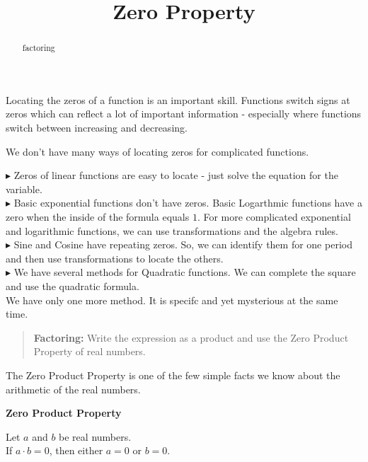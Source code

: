 \documentclass{ximera}
\title{Zero Property}
\begin{document}
\begin{abstract}
factoring
\end{abstract}
\maketitle




Locating the zeros of a function is an important skill.  Functions switch signs at zeros which can reflect a lot of important information  - especially where functions switch between increasing and decreasing.

We don't have many ways of locating zeros for complicated functions.


\textbf{\textcolor{blue!55!black}{$\blacktriangleright$}} Zeros of linear functions are easy to locate - just solve the equation for the variable. \\


\textbf{\textcolor{blue!55!black}{$\blacktriangleright$}} Basic exponential functions don't have zeros.  Basic Logarthmic functions have a zero when the inside of the formula equals $1$. For more complicated exponential and logarithmic functions, we can use transformations and the algebra rules. \\

\textbf{\textcolor{blue!55!black}{$\blacktriangleright$}} Sine and Cosine have repeating zeros. So, we can identify them for one period and then use transformations to locate the others. \\

\textbf{\textcolor{blue!55!black}{$\blacktriangleright$}} We have several methods for Quadratic functions.  We can complete the square and use the quadratic formula. \\



We have only one more method.  It is specifc and yet mysterious at the same time.



\begin{quote}
\textbf{Factoring: } Write the expression as a product and use the Zero Product Property of real numbers.
\end{quote}



The Zero Product Property is one of the few simple facts we know about the arithmetic of the real numbers.


\begin{definition} \textbf{\textcolor{green!50!black}{Zero Product Property}}  

Let $a$ and $b$ be real numbers. \\

If $a \cdot b = 0$, then either $a=0$ or $b=0$.


\end{definition}
\end{document}
